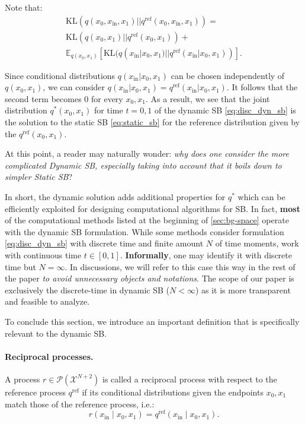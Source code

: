 Note that:
\begin{eqnarray}
    \label{eq:disc_disintegration}
    \text{KL}(q(x_0, x_{\text{in}}, x_1)|| q^{\text{ref}}(x_0, x_{\text{in}}, x_1)) = 
    \nonumber
    \\
    \text{KL}(q(x_0, x_1)||q^{\text{ref}}(x_0, x_1)) + 
    \nonumber
    \\ \mathbb{E}_{q(x_0,x_1)} \left[\text{KL}(q(x_{\text{in}}|x_0, x_1)||q^{\text{ref}}(x_{\text{in}}|x_0, x_1)) \right]. 
    \label{kl-reciprocal-zero}
\end{eqnarray}

Since conditional distributions $q(x_{\text{in}}|x_0, x_1)$ can be chosen independently of $q(x_0, x_1)$, we can consider $q(x_{\text{in}}|x_0, x_1) = q^{\text{ref}}(x_{\text{in}}|x_0, x_1)$. It follows that the second term becomes $0$ for every $x_0,x_1$. As a result, we see that the joint distribution $q^{*}(x_0,x_1)$ for time $t=0,1$ of the dynamic SB \eqref{eq:disc_dyn_sb} is the solution to the static SB \eqref{eq:static_sb} for the reference distribution given by the $q^{\text{ref}}(x_0,x_1)$.

At this point, a reader may naturally wonder: \textit{why does one consider the more complicated Dynamic SB, especially taking into account that it boils down to simpler Static SB}?

In short, the dynamic solution adds additional properties for $q^{*}$ which can be efficiently exploited for designing computational algorithms for SB. In fact, \textbf{most} of the computational methods listed at the beginning of \wasyparagraph\ref{sec:bg-space} operate with the dynamic SB formulation. While some methods \cite{de2021diffusion,gushchin2024adversarial} consider formulation \eqref{eq:disc_dyn_sb} with discrete time and finite amount $N$ of time moments, \citep{shi2023diffusion,chen2022likelihood,gushchin2024light} work with continuous time $t\in [0,1]$. \textbf{Informally}, one may identify it with discrete time but $N=\infty$. In discussions, we will refer to this case this way in the rest of the paper \textit{to avoid unnecessary objects and notations}. The scope of our paper is exclusively the discrete-time in dynamic SB ($N<\infty$) as it is more transparent and feasible to analyze.

To conclude this section, we introduce an important definition that is specifically relevant to the dynamic SB.

\paragraph{Reciprocal processes.} A process $r \in \mathcal{P}(\mathcal{X}^{N+2})$ is called a reciprocal process with respect to the reference process $q^{\text{ref}}$ if its conditional distributions given the endpoints $x_0, x_1$ match those of the reference process, i.e.:
\begin{equation*}
    r(x_{\text{in}} \mid x_0, x_1) = q^{\text{ref}}(x_{\text{in}} \mid x_0, x_1).
\end{equation*}
    
